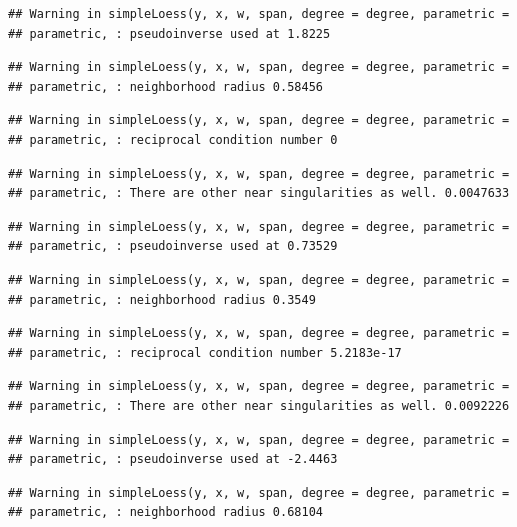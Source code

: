 \documentclass[]{article}
\begin{document}
\begin{verbatim}
## Warning in simpleLoess(y, x, w, span, degree = degree, parametric =
## parametric, : pseudoinverse used at 1.8225
\end{verbatim}

\begin{verbatim}
## Warning in simpleLoess(y, x, w, span, degree = degree, parametric =
## parametric, : neighborhood radius 0.58456
\end{verbatim}

\begin{verbatim}
## Warning in simpleLoess(y, x, w, span, degree = degree, parametric =
## parametric, : reciprocal condition number 0
\end{verbatim}

\begin{verbatim}
## Warning in simpleLoess(y, x, w, span, degree = degree, parametric =
## parametric, : There are other near singularities as well. 0.0047633
\end{verbatim}

\begin{verbatim}
## Warning in simpleLoess(y, x, w, span, degree = degree, parametric =
## parametric, : pseudoinverse used at 0.73529
\end{verbatim}

\begin{verbatim}
## Warning in simpleLoess(y, x, w, span, degree = degree, parametric =
## parametric, : neighborhood radius 0.3549
\end{verbatim}

\begin{verbatim}
## Warning in simpleLoess(y, x, w, span, degree = degree, parametric =
## parametric, : reciprocal condition number 5.2183e-17
\end{verbatim}

\begin{verbatim}
## Warning in simpleLoess(y, x, w, span, degree = degree, parametric =
## parametric, : There are other near singularities as well. 0.0092226
\end{verbatim}

\begin{verbatim}
## Warning in simpleLoess(y, x, w, span, degree = degree, parametric =
## parametric, : pseudoinverse used at -2.4463
\end{verbatim}

\begin{verbatim}
## Warning in simpleLoess(y, x, w, span, degree = degree, parametric =
## parametric, : neighborhood radius 0.68104
\end{verbatim}
\end{document}

